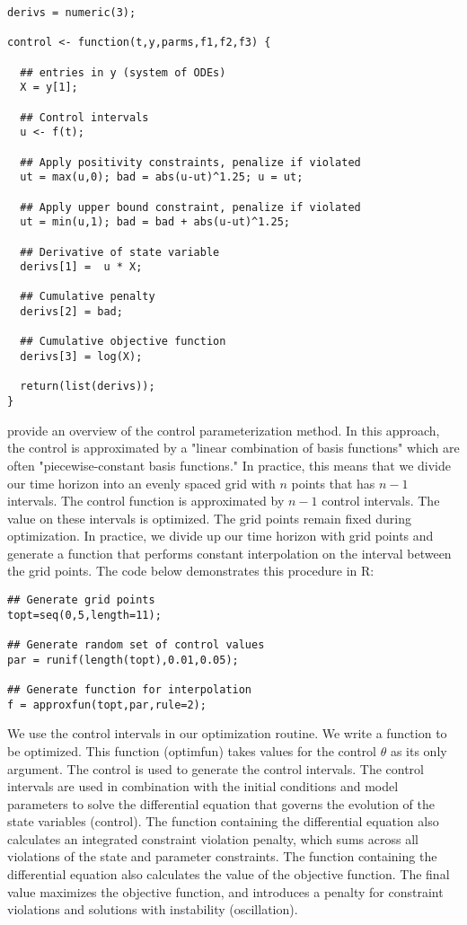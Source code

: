 \documentclass[12pt, oneside]{article}   	%
\begin{document}
\begin{lstlisting}
derivs = numeric(3);

control <- function(t,y,parms,f1,f2,f3) {
  
  ## entries in y (system of ODEs)
  X = y[1];
  
  ## Control intervals
  u <- f(t);
  
  ## Apply positivity constraints, penalize if violated
  ut = max(u,0); bad = abs(u-ut)^1.25; u = ut;
  
  ## Apply upper bound constraint, penalize if violated
  ut = min(u,1); bad = bad + abs(u-ut)^1.25; 
  
  ## Derivative of state variable
  derivs[1] =  u * X;
  
  ## Cumulative penalty
  derivs[2] = bad;
  
  ## Cumulative objective function
  derivs[3] = log(X);
  
  return(list(derivs));
}

\end{lstlisting}


\cite{lin2014} provide an overview of the control parameterization method. In this approach, the control is approximated by a "linear combination of basis functions" which are often "piecewise-constant basis functions." In practice, this means that we divide our time horizon into an evenly spaced grid with $n$ points that has $n-1$ intervals. The control function is approximated by $n-1$ control intervals. The value on these intervals is optimized. The grid points remain fixed during optimization. In practice, we divide up our time horizon with grid points and generate a function that performs constant interpolation on the interval between the grid points. The code below demonstrates this procedure in R:

\begin{lstlisting}
## Generate grid points
topt=seq(0,5,length=11); 

## Generate random set of control values
par = runif(length(topt),0.01,0.05); 

## Generate function for interpolation
f = approxfun(topt,par,rule=2);
\end{lstlisting}

We use the control intervals in our optimization routine. We write a function to be optimized. This function (optimfun) takes values for the control $\theta$ as its only argument. The control is used to generate the control intervals. The control intervals are used in combination with the initial conditions and model parameters to solve the differential equation that governs the evolution of the state variables (control). The function containing the differential equation also calculates an integrated constraint violation penalty, which sums across all violations of the state and parameter constraints. The function containing the differential equation also calculates the value of the objective function. The final value maximizes the objective function, and introduces a penalty for constraint violations and solutions with instability (oscillation).
\end{document}
